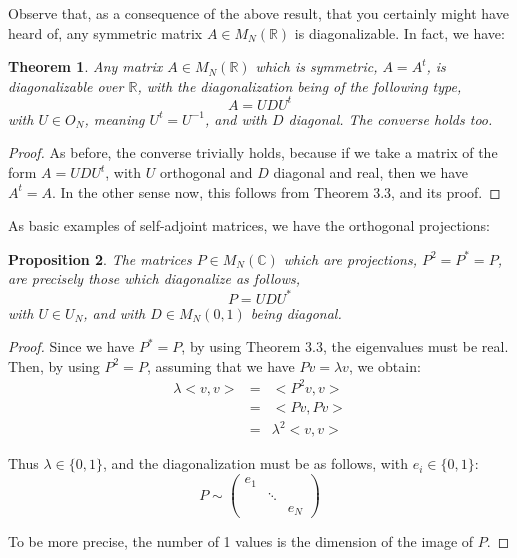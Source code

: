 \documentclass[12pt]{amsbook}
\newtheorem{theorem}{Theorem}[chapter]
\newtheorem{proposition}[theorem]{Proposition}
\begin{document}
Observe that, as a consequence of the above result, that you certainly might have heard of, any symmetric matrix $A\in M_N(\mathbb R)$ is diagonalizable. In fact, we have:


\begin{theorem}
Any matrix $A\in M_N(\mathbb R)$ which is symmetric, $A=A^t$, is diagonalizable over $\mathbb R$, with the diagonalization being of the following type,
$$A=UDU^t$$
with $U\in O_N$, meaning $U^t=U^{-1}$, and with $D$ diagonal. The converse holds too.
\end{theorem}

\begin{proof}
As before, the converse trivially holds, because if we take a matrix of the form $A=UDU^t$, with $U$ orthogonal and $D$ diagonal and real, then we have $A^t=A$. In the other sense now, this follows from Theorem 3.3, and its proof.
\end{proof}

As basic examples of self-adjoint matrices, we have the orthogonal projections:


\begin{proposition}
The matrices $P\in M_N(\mathbb C)$ which are projections, $P^2=P^*=P$, 
are precisely those which diagonalize as follows,
$$P=UDU^*$$
with $U\in U_N$, and with $D\in M_N(0,1)$ being diagonal.
\end{proposition}

\begin{proof}
Since we have $P^*=P$, by using Theorem 3.3, the eigenvalues must be real. Then, by using $P^2=P$, assuming that we have $Pv=\lambda v$, we obtain:
\begin{eqnarray*}
\lambda<v,v>
&=&<P^2v,v>\\
&=&<Pv,Pv>\\
&=&\lambda^2<v,v>
\end{eqnarray*}

Thus $\lambda\in\{0,1\}$, and the diagonalization must be as follows, with $e_i\in \{0,1\}$:
$$P\sim\begin{pmatrix}
e_1\\
&\ddots\\
&&e_N
\end{pmatrix}$$

To be more precise, the number of 1 values is the dimension of the image of $P$.
\end{proof}
\end{document}
